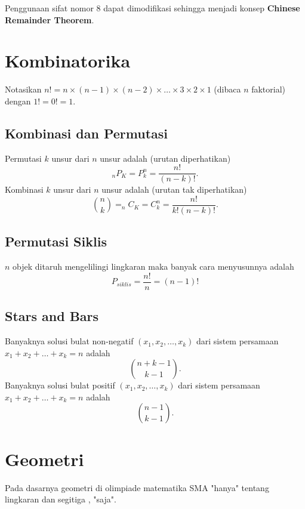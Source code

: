 \documentclass[11pt]{scrartcl}
\begin{document}
    Penggunaan sifat nomor 8 dapat dimodifikasi sehingga menjadi konsep \textbf{Chinese Remainder Theorem}.
    
    \section{Kombinatorika}
    
    Notasikan $n!=n \times (n-1) \times (n-2) \times \dots \times 3 \times 2 \times 1$ (dibaca $n$ faktorial) dengan $1!=0!=1$.
    
    \subsection{Kombinasi dan Permutasi}
    Permutasi $k$ unsur dari $n$ unsur adalah (urutan diperhatikan)
    $$_nP_K = P_k^n = \dfrac{n!}{(n-k)!}.$$
    Kombinasi $k$ unsur dari $n$ unsur adalah (urutan tak diperhatikan)
    $${n \choose k}=_nC_K = C_k^n = \dfrac{n!}{k!(n-k)!}.$$
    
    \subsection{Permutasi Siklis}
    $n$ objek ditaruh mengelilingi lingkaran maka banyak cara menyusunnya adalah
    $$P_{siklis} =\dfrac{n!}{n} = (n-1)!$$
    
    \subsection{Stars and Bars}
    Banyaknya solusi bulat non-negatif $(x_1,x_2,\dots,x_k)$ dari sistem persamaan $x_1+x_2+\dots+x_k=n$ adalah
    $${n+k-1 \choose k-1}.$$
    Banyaknya solusi bulat positif $(x_1,x_2,\dots,x_k)$ dari sistem persamaan $x_1+x_2+\dots+x_k=n$ adalah
    $${n-1 \choose k-1}.$$
    
    \section{Geometri}
    Pada dasarnya geometri di olimpiade matematika SMA "hanya" tentang lingkaran dan segitiga , "saja". 
    
\end{document}
